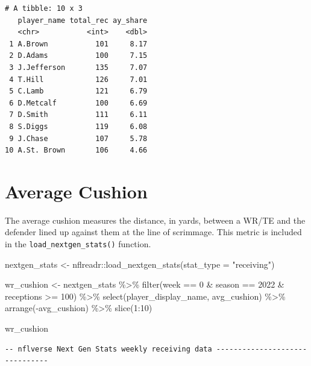 \documentclass[
  letterpaper,
]{krantz}
\newenvironment{Shaded}{\begin{snugshade}}{\end{snugshade}}
\newcommand{\AttributeTok}[1]{\textcolor[rgb]{0.40,0.45,0.13}{#1}}
\newcommand{\DecValTok}[1]{\textcolor[rgb]{0.68,0.00,0.00}{#1}}
\newcommand{\FunctionTok}[1]{\textcolor[rgb]{0.28,0.35,0.67}{#1}}
\newcommand{\NormalTok}[1]{\textcolor[rgb]{0.00,0.23,0.31}{#1}}
\newcommand{\OtherTok}[1]{\textcolor[rgb]{0.00,0.23,0.31}{#1}}
\newcommand{\SpecialCharTok}[1]{\textcolor[rgb]{0.37,0.37,0.37}{#1}}
\newcommand{\StringTok}[1]{\textcolor[rgb]{0.13,0.47,0.30}{#1}}
\begin{document}
\begin{verbatim}
# A tibble: 10 x 3
   player_name total_rec ay_share
   <chr>           <int>    <dbl>
 1 A.Brown           101     8.17
 2 D.Adams           100     7.15
 3 J.Jefferson       135     7.07
 4 T.Hill            126     7.01
 5 C.Lamb            121     6.79
 6 D.Metcalf         100     6.69
 7 D.Smith           111     6.11
 8 S.Diggs           119     6.08
 9 J.Chase           107     5.78
10 A.St. Brown       106     4.66
\end{verbatim}

\hypertarget{average-cushion}{%
\section{Average Cushion}\label{average-cushion}}

The average cushion measures the distance, in yards, between a WR/TE and
the defender lined up against them at the line of scrimmage. This metric
is included in the \texttt{load\_nextgen\_stats()} function.

\begin{Shaded}
\begin{Highlighting}[]
\NormalTok{nextgen\_stats }\OtherTok{\textless{}{-}}\NormalTok{ nflreadr}\SpecialCharTok{::}\FunctionTok{load\_nextgen\_stats}\NormalTok{(}\AttributeTok{stat\_type =} \StringTok{"receiving"}\NormalTok{)}

\NormalTok{wr\_cushion }\OtherTok{\textless{}{-}}\NormalTok{ nextgen\_stats }\SpecialCharTok{\%\textgreater{}\%}
  \FunctionTok{filter}\NormalTok{(week }\SpecialCharTok{==} \DecValTok{0} \SpecialCharTok{\&}\NormalTok{ season }\SpecialCharTok{==} \DecValTok{2022} \SpecialCharTok{\&}\NormalTok{ receptions }\SpecialCharTok{\textgreater{}=} \DecValTok{100}\NormalTok{) }\SpecialCharTok{\%\textgreater{}\%}
  \FunctionTok{select}\NormalTok{(player\_display\_name, avg\_cushion) }\SpecialCharTok{\%\textgreater{}\%}
  \FunctionTok{arrange}\NormalTok{(}\SpecialCharTok{{-}}\NormalTok{avg\_cushion) }\SpecialCharTok{\%\textgreater{}\%}
  \FunctionTok{slice}\NormalTok{(}\DecValTok{1}\SpecialCharTok{:}\DecValTok{10}\NormalTok{)}

\NormalTok{wr\_cushion}
\end{Highlighting}
\end{Shaded}

\begin{verbatim}
-- nflverse Next Gen Stats weekly receiving data -------------------------------
\end{verbatim}
\end{document}
